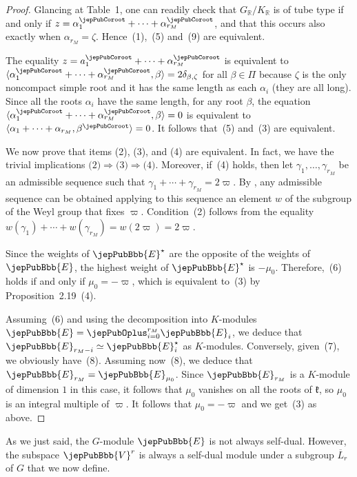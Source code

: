 \begin{proof}
Glancing at Table~1, one can readily check that $G_{\mathbb R}/K_{\mathbb R}$ is of tube type if and only if $z=\alpha_1^\jepPubCoroot+\cdots+\alpha_{r_M}^\jepPubCoroot$, and that this occurs also exactly when $\alpha_{r_M}=\zeta$. Hence~(1),~(5) and~(9) are equivalent.

The equality $z=a_1^\jepPubCoroot+\cdots+\alpha_{r_M}^\jepPubCoroot$ is equivalent to $\langle\alpha_1^\jepPubCoroot+\cdots+\alpha_{r_M}^\jepPubCoroot,\beta\rangle=2\delta_{\beta,\zeta}$ for all $\beta\in\Pi$ because $\zeta$ is the only noncompact simple root and it has the same length as each $\alpha_i$ (they are all long). Since all the roots $\alpha_i$ have the same length, for any root $\beta$, the equation $\langle\alpha_1^\jepPubCoroot+\cdots+\alpha_{r_M}^\jepPubCoroot,\beta\rangle=0$ is equivalent to $\langle\alpha_1+\cdots+\alpha_{r_M},\beta^\jepPubCoroot\rangle=0$. It follows that~(5) and~(3) are equivalent.

We now prove that items (2), (3), and (4) are equivalent. In fact, we have the trivial implications $\text{(2)}\Rightarrow\text{(3)}\Rightarrow\text{(4)}$. Moreover, if~(4) holds, then let $\gamma_1,\ldots,\gamma_{r_M}$ be an admissible sequence such that $\gamma_1+\cdots+\gamma_{r_M}=2\varpi$. By \cite[Th.~2.1]{jep93RRS92}, any admissible sequence can be obtained applying to this sequence an element $w$ of the subgroup of the Weyl group that fixes $\varpi$. Condition~(2) follows from the equality $w(\gamma_1)+\cdots+w(\gamma_{r_M})=w(2\varpi)=2\varpi$.

Since the weights of $\jepPubBbb{E}^{\star}$ are the opposite of the weights of $\jepPubBbb{E}$, the highest weight of $\jepPubBbb{E}^{\star}$ is $-\mu_0$. Therefore,~(6) holds if and only if $\mu_0=-\varpi$, which is equivalent to~(3) by Proposition~2.19~(4).

Assuming~(6) and using the decomposition into $K$-modules $\jepPubBbb{E}=\jepPubOplus_{i=0}^{r_M}\jepPubBbb{E}_i$, we deduce that $\jepPubBbb{E}_{r_M-i}\simeq\jepPubBbb{E}_i^{\star}$ as $K$-modules. Conversely, given~(7), we obviously have~(8). Assuming now~(8), we deduce that $\jepPubBbb{E}_{r_M}=\jepPubBbb{E}_{\mu_0}$. Since $\jepPubBbb{E}_{r_M}$ is a $K$-module of dimension $1$ in this case, it follows that $\mu_0$ vanishes on all the roots of $\mathfrak k$, so $\mu_0$ is an integral multiple of $\varpi$. It follows that $\mu_0=-\varpi$ and we get~(3) as above.
\end{proof}
As we just said, the $G$-module $\jepPubBbb{E}$ is not always self-dual. However, the subspace $\jepPubBbb{V}^r$ is always a self-dual module under a subgroup $\overline L_r$ of $G$ that we now define.

